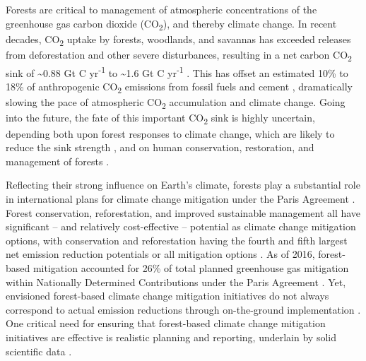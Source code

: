 \documentclass[, manuscript]{copernicus}
\begin{document}
\introduction[Introduction]

Forests are critical to management of atmospheric concentrations of the
greenhouse gas carbon dioxide (CO\textsubscript{2}), and thereby climate
change. In recent decades, CO\textsubscript{2} uptake by forests,
woodlands, and savannas has exceeded releases from deforestation and
other severe disturbances, resulting in a net carbon CO\textsubscript{2}
sink of \textasciitilde0.88 Gt C yr\textsuperscript{-1} \citep[all
biomes with trees,][]{xu_changes_2021} to \textasciitilde1.6 Gt C
yr\textsuperscript{-1} \citep[forests only,][]{harris_global_2021}. This
has offset an estimated 10\% to 18\% of anthropogenic
CO\textsubscript{2} emissions from fossil fuels and cement
\citep{xu_changes_2021, harris_global_2021}, dramatically slowing the
pace of atmospheric CO\textsubscript{2} accumulation and climate change.
Going into the future, the fate of this important CO\textsubscript{2}
sink is highly uncertain, depending both upon forest responses to
climate change, which are likely to reduce the sink strength
\citep{mcdowell_pervasive_2020, hammond_global_2022}, and on human
conservation, restoration, and management of forests
\citep{ipcc_climate_2019, ipcc_climate_2022}.

Reflecting their strong influence on Earth's climate, forests play a
substantial role in international plans for climate change mitigation
under the Paris Agreement \citep{unfccc_adoption_2015}. Forest
conservation, reforestation, and improved sustainable management all
have significant -- and relatively cost-effective -- potential as
climate change mitigation options, with conservation and reforestation
having the fourth and fifth largest net emission reduction potentials or
all mitigation options \citep{ipcc_summary_2022}. As of 2016,
forest-based mitigation accounted for 26\% of total planned greenhouse
gas mitigation within Nationally Determined Contributions under the
Paris Agreement \citep{grassi_key_2017}. Yet, envisioned forest-based
climate change mitigation initiatives do not always correspond to actual
emission reductions through on-the-ground implementation
\citep[e.g.,][]{badgley_systematic_2022}. One critical need for ensuring
that forest-based climate change mitigation initiatives are effective is
realistic planning and reporting, underlain by solid scientific data
\citep{anderson-teixeira_effective_2022, deng_comparing_2021}.
\end{document}
